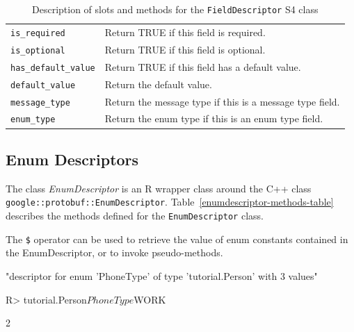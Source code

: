 \documentclass[article]{jss}
\begin{document}
\begin{table}[h]
\begin{small}
\begin{tabular}{l|p{10cm}}
\texttt{is\_required} & Return TRUE if this field is required.\\
\texttt{is\_optional} & Return TRUE if this field is optional.\\
\texttt{has\_default\_value} & Return TRUE if this field has a default value.\\
\texttt{default\_value} & Return the default value.\\
\texttt{message\_type} & Return the message type if this is a message type field.\\
\texttt{enum\_type} & Return the enum type if this is an enum type field.\\
\hline
\end{tabular}
\end{small}
\caption{\label{fielddescriptor-methods-table}Description of slots and
  methods for the \texttt{FieldDescriptor} S4 class}
\end{table}


\subsection{Enum Descriptors}
\label{subsec-enum-descriptor}

The class \emph{EnumDescriptor} is an R wrapper
class around the C++ class \texttt{google::protobuf::EnumDescriptor}.
Table~\ref{enumdescriptor-methods-table} describes the methods
defined for the \texttt{EnumDescriptor} class.

The \verb|$| operator can be used to retrieve the value of enum
constants contained in the EnumDescriptor, or to invoke
pseudo-methods.

\begin{Schunk}
\begin{Soutput}
[1] "descriptor for enum 'PhoneType' of type 'tutorial.Person' with 3 values"
\end{Soutput}
\begin{Sinput}
R> tutorial.Person$PhoneType$WORK
\end{Sinput}
\begin{Soutput}
[1] 2
\end{Soutput}
\end{Schunk}
\end{document}
